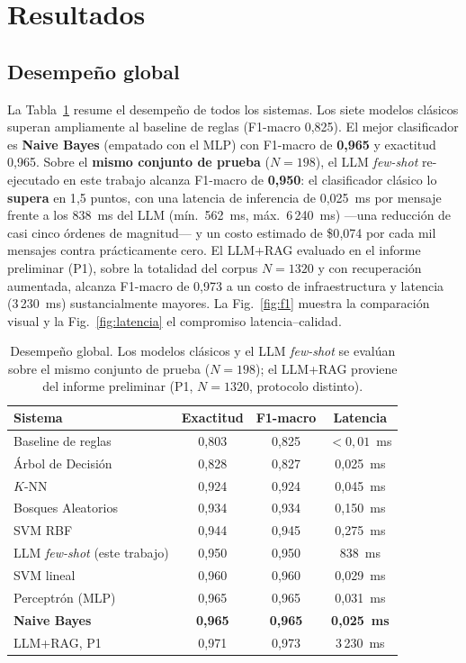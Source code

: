 \documentclass[journal]{IEEEtran}
\begin{document}
\section{Resultados}

\subsection{Desempe\~no global}
La Tabla~\ref{tab:global} resume el desempe\~no de todos los sistemas. Los siete
modelos cl\'asicos superan ampliamente al baseline de reglas (F1-macro 0{,}825).
El mejor clasificador es \textbf{Naive Bayes} (empatado con el MLP) con
F1-macro de \textbf{0{,}965} y exactitud 0{,}965. Sobre el \textbf{mismo
conjunto de prueba} ($N=198$), el LLM \emph{few-shot} re-ejecutado en este
trabajo alcanza F1-macro de \textbf{0{,}950}: el clasificador cl\'asico lo
\textbf{supera} en 1{,}5 puntos, con una latencia de inferencia de 0{,}025~ms
por mensaje frente a los 838~ms del LLM (m\'in.\ 562~ms, m\'ax.\ 6\,240~ms) ---una
reducci\'on de casi cinco \'ordenes de magnitud--- y un costo estimado de
\$0{,}074 por cada mil mensajes contra pr\'acticamente cero. El LLM+RAG
evaluado en el informe preliminar (P1), sobre la totalidad del corpus
$N=1320$ y con recuperaci\'on aumentada, alcanza F1-macro de 0{,}973 a un costo
de infraestructura y latencia (3\,230~ms) sustancialmente mayores. La
Fig.~\ref{fig:f1} muestra la comparaci\'on visual y la Fig.~\ref{fig:latencia}
el compromiso latencia--calidad.

\begin{table}[!t]
\centering
\caption{Desempe\~no global. Los modelos cl\'asicos y el LLM \emph{few-shot} se
eval\'uan sobre el mismo conjunto de prueba ($N=198$); el LLM+RAG proviene del
informe preliminar (P1, $N=1320$, protocolo distinto).}
\label{tab:global}
\begin{tabular}{lccc}
\toprule
\textbf{Sistema} & \textbf{Exactitud} & \textbf{F1-macro} & \textbf{Latencia} \\
\midrule
Baseline de reglas    & 0{,}803 & 0{,}825 & $<0{,}01$~ms \\
\'Arbol de Decisi\'on & 0{,}828 & 0{,}827 & 0{,}025~ms \\
$K$-NN                & 0{,}924 & 0{,}924 & 0{,}045~ms \\
Bosques Aleatorios    & 0{,}934 & 0{,}934 & 0{,}150~ms \\
SVM RBF               & 0{,}944 & 0{,}945 & 0{,}275~ms \\
LLM \emph{few-shot} (este trabajo) & 0{,}950 & 0{,}950 & 838~ms \\
SVM lineal            & 0{,}960 & 0{,}960 & 0{,}029~ms \\
Perceptr\'on (MLP)    & 0{,}965 & 0{,}965 & 0{,}031~ms \\
\textbf{Naive Bayes}  & \textbf{0{,}965} & \textbf{0{,}965} & \textbf{0{,}025~ms} \\
\midrule
LLM+RAG, P1 \cite{brown2020gpt3} & 0{,}971 & 0{,}973 & 3\,230~ms \\
\bottomrule
\end{tabular}
\end{table}
\end{document}
